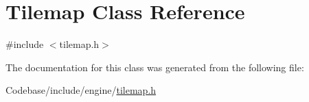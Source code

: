 \hypertarget{class_tilemap}{\section{Tilemap Class Reference}
\label{class_tilemap}
}


{\ttfamily \#include $<$tilemap.\-h$>$}



The documentation for this class was generated from the following file\-:\begin{DoxyCompactItemize}
\item 
Codebase/include/engine/\hyperlink{_codebase_2include_2engine_2tilemap_8h}{tilemap.\-h}\end{DoxyCompactItemize}
